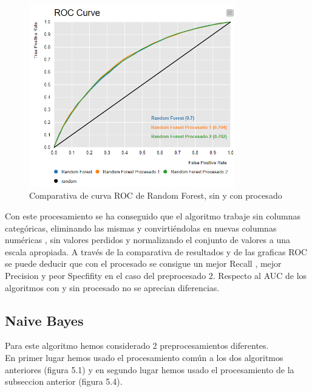 	\begin{figure}[htb]
		\centering
		\includegraphics[width=0.8\textwidth]{./imagenes/63}
		\caption{Comparativa de curva ROC de Random Forest, sin y con procesado} \label{fig:1}
	\end{figure}
	
	Con este procesamiento se ha conseguido que el algoritmo trabaje sin columnas categóricas, eliminando las mismas y convirtiéndolas en nuevas columnas numéricas , sin valores perdidos y normalizando el conjunto de valores a una escala apropiada. A través de la comparativa de resultados y de las graficas ROC se puede deducir que con el procesado se consigue un mejor Recall , mejor Precision y peor Specfifity en el caso del preprocesado 2. Respecto al AUC de los algoritmos con y sin procesado no se aprecian diferencias.
	
	
	\subsection{Naive Bayes}
	
	Para este algoritmo hemos considerado 2 preprocesamientos diferentes.\\
	
	En primer lugar hemos usado el procesamiento común a los dos algoritmos anteriores (figura 5.1) y en segundo lugar hemos usado el procesamiento de la subseccion anterior (figura 5.4). \\
	
